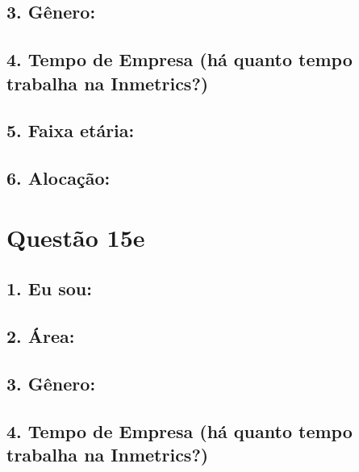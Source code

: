 \documentclass[]{book}
\begin{document}
\hypertarget{genero-26}{%
\subsection{3. Gênero:}\label{genero-26}}

\hypertarget{tempo-de-empresa-ha-quanto-tempo-trabalha-na-inmetrics-26}{%
\subsection{4. Tempo de Empresa (há quanto tempo trabalha na Inmetrics?)}\label{tempo-de-empresa-ha-quanto-tempo-trabalha-na-inmetrics-26}}

\hypertarget{faixa-etaria-26}{%
\subsection{5. Faixa etária:}\label{faixa-etaria-26}}

\hypertarget{alocacao-26}{%
\subsection{6. Alocação:}\label{alocacao-26}}

\hypertarget{questao-15e}{%
\section{Questão 15e}\label{questao-15e}}

\hypertarget{eu-sou-27}{%
\subsection{1. Eu sou:}\label{eu-sou-27}}

\hypertarget{area-27}{%
\subsection{2. Área:}\label{area-27}}

\hypertarget{genero-27}{%
\subsection{3. Gênero:}\label{genero-27}}

\hypertarget{tempo-de-empresa-ha-quanto-tempo-trabalha-na-inmetrics-27}{%
\subsection{4. Tempo de Empresa (há quanto tempo trabalha na Inmetrics?)}\label{tempo-de-empresa-ha-quanto-tempo-trabalha-na-inmetrics-27}}
\end{document}
